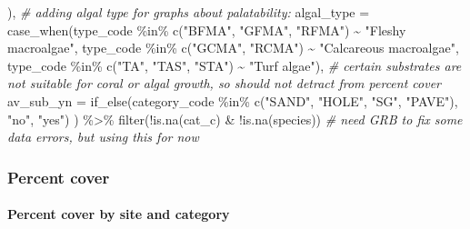 \documentclass[
]{article}
\newenvironment{Shaded}{\begin{snugshade}}{\end{snugshade}}
\newcommand{\AttributeTok}[1]{\textcolor[rgb]{0.77,0.63,0.00}{#1}}
\newcommand{\CommentTok}[1]{\textcolor[rgb]{0.56,0.35,0.01}{\textit{#1}}}
\newcommand{\FunctionTok}[1]{\textcolor[rgb]{0.00,0.00,0.00}{#1}}
\newcommand{\NormalTok}[1]{#1}
\newcommand{\SpecialCharTok}[1]{\textcolor[rgb]{0.00,0.00,0.00}{#1}}
\newcommand{\StringTok}[1]{\textcolor[rgb]{0.31,0.60,0.02}{#1}}
\begin{document}
\begin{Shaded}
\begin{Highlighting}[]
\NormalTok{                                    ),}
         \CommentTok{\# adding algal type for graphs about palatability:}
         \AttributeTok{algal\_type =} \FunctionTok{case\_when}\NormalTok{(type\_code }\SpecialCharTok{\%in\%} \FunctionTok{c}\NormalTok{(}\StringTok{"BFMA"}\NormalTok{, }\StringTok{"GFMA"}\NormalTok{, }\StringTok{"RFMA"}\NormalTok{) }\SpecialCharTok{\textasciitilde{}} \StringTok{"Fleshy macroalgae"}\NormalTok{,}
\NormalTok{                                type\_code }\SpecialCharTok{\%in\%} \FunctionTok{c}\NormalTok{(}\StringTok{"GCMA"}\NormalTok{, }\StringTok{"RCMA"}\NormalTok{) }\SpecialCharTok{\textasciitilde{}} \StringTok{"Calcareous macroalgae"}\NormalTok{,}
\NormalTok{                                type\_code }\SpecialCharTok{\%in\%} \FunctionTok{c}\NormalTok{(}\StringTok{"TA"}\NormalTok{, }\StringTok{"TAS"}\NormalTok{, }\StringTok{"STA"}\NormalTok{) }\SpecialCharTok{\textasciitilde{}} \StringTok{"Turf algae"}\NormalTok{),}
         \CommentTok{\# certain substrates are not suitable for coral or algal growth, so should not detract from percent cover}
         \AttributeTok{av\_sub\_yn =} \FunctionTok{if\_else}\NormalTok{(category\_code }\SpecialCharTok{\%in\%} \FunctionTok{c}\NormalTok{(}\StringTok{"SAND"}\NormalTok{, }\StringTok{"HOLE"}\NormalTok{, }\StringTok{"SG"}\NormalTok{, }\StringTok{"PAVE"}\NormalTok{), }\StringTok{"no"}\NormalTok{, }\StringTok{"yes"}\NormalTok{)}
\NormalTok{         ) }\SpecialCharTok{\%\textgreater{}\%}
    \FunctionTok{filter}\NormalTok{(}\SpecialCharTok{!}\FunctionTok{is.na}\NormalTok{(cat\_c) }\SpecialCharTok{\&} \SpecialCharTok{!}\FunctionTok{is.na}\NormalTok{(species)) }\CommentTok{\# need GRB to fix some data errors, but using this for now}
\end{Highlighting}
\end{Shaded}

\hypertarget{percent-cover}{%
\subsubsection{Percent cover}\label{percent-cover}}

\hypertarget{percent-cover-by-site-and-category}{%
\paragraph{Percent cover by site and
category}\label{percent-cover-by-site-and-category}}
\end{document}

